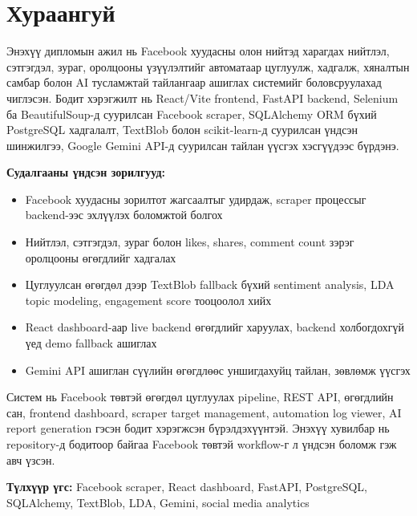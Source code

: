 \chapter*{Хураангуй}

Энэхүү дипломын ажил нь Facebook хуудасны олон нийтэд харагдах нийтлэл, сэтгэгдэл, зураг, оролцооны үзүүлэлтийг автоматаар цуглуулж, хадгалж, хяналтын самбар болон AI тусламжтай тайлангаар ашиглах системийг боловсруулахад чиглэсэн. Бодит хэрэгжилт нь React/Vite frontend, FastAPI backend, Selenium ба BeautifulSoup-д суурилсан Facebook scraper, SQLAlchemy ORM бүхий PostgreSQL хадгалалт, TextBlob болон scikit-learn-д суурилсан үндсэн шинжилгээ, Google Gemini API-д суурилсан тайлан үүсгэх хэсгүүдээс бүрдэнэ.

\textbf{Судалгааны үндсэн зорилгууд:}
\begin{itemize}
    \item Facebook хуудасны зорилтот жагсаалтыг удирдаж, scraper процессыг backend-ээс эхлүүлэх боломжтой болгох
    \item Нийтлэл, сэтгэгдэл, зураг болон likes, shares, comment count зэрэг оролцооны өгөгдлийг хадгалах
    \item Цуглуулсан өгөгдөл дээр TextBlob fallback бүхий sentiment analysis, LDA topic modeling, engagement score тооцоолол хийх
    \item React dashboard-аар live backend өгөгдлийг харуулах, backend холбогдохгүй үед demo fallback ашиглах
    \item Gemini API ашиглан сүүлийн өгөгдлөөс уншигдахуйц тайлан, зөвлөмж үүсгэх
\end{itemize}

Систем нь Facebook төвтэй өгөгдөл цуглуулах pipeline, REST API, өгөгдлийн сан, frontend dashboard, scraper target management, automation log viewer, AI report generation гэсэн бодит хэрэгжсэн бүрэлдэхүүнтэй. Энэхүү хувилбар нь repository-д бодитоор байгаа Facebook төвтэй workflow-г л үндсэн боломж гэж авч үзсэн.

\textbf{Түлхүүр үгс:} Facebook scraper, React dashboard, FastAPI, PostgreSQL, SQLAlchemy, TextBlob, LDA, Gemini, social media analytics
